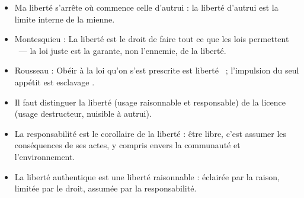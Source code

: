 \documentclass[11pt]{article}
\newcommand{\cle}[1]{{\popxbold\color{popdark}#1}}
\begin{document}
\begin{aretenir}
\begin{itemize}
\item Ma liberté s'arrête où commence celle d'autrui : la liberté d'autrui est la limite interne de la mienne.
\item Montesquieu : \guillemotleft La liberté est le droit de faire tout ce que les lois permettent \guillemotright\ — la loi juste est la garante, non l'ennemie, de la liberté.
\item Rousseau : \guillemotleft Obéir à la loi qu'on s'est prescrite est liberté \guillemotright\ ; \guillemotleft l'impulsion du seul appétit est esclavage \guillemotright.
\item Il faut distinguer la \cle{liberté} (usage raisonnable et responsable) de la \cle{licence} (usage destructeur, nuisible à autrui).
\item La responsabilité est le corollaire de la liberté : être libre, c'est assumer les conséquences de ses actes, y compris envers la communauté et l'environnement.
\item La liberté authentique est une liberté \cle{raisonnable} : éclairée par la raison, limitée par le droit, assumée par la responsabilité.
\end{itemize}
\end{aretenir}
\end{document}
